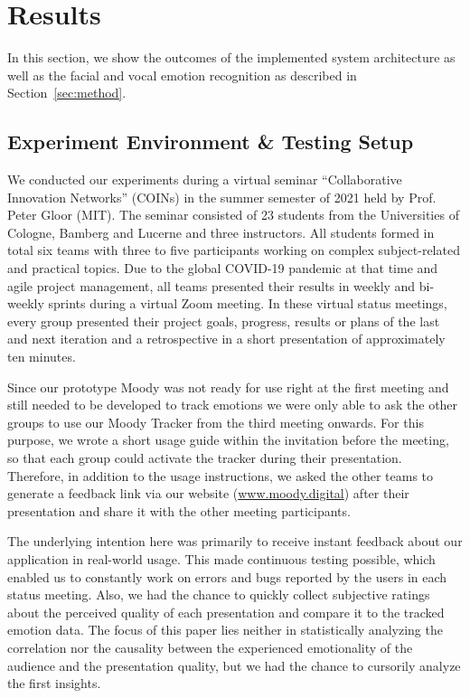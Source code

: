 \section{Results}
\label{sec:results}
In this section, we show the outcomes of the implemented system architecture as well as the facial and vocal emotion recognition as described in Section~\ref{sec:method}.

\subsection{Experiment Environment \& Testing Setup}
\label{subsec:results_experiment_environment_and_testing_setup}
We conducted our experiments during a virtual seminar ``Collaborative Innovation Networks'' (COINs) in the summer semester of 2021 held by Prof. Peter Gloor (MIT). The seminar consisted of 23 students from the Universities of Cologne, Bamberg and Lucerne and three instructors. All students formed in total six teams with three to five participants working on complex subject-related and practical topics. Due to the global COVID-19 pandemic at that time and agile project management, all teams presented their results in weekly and bi-weekly sprints during a virtual Zoom meeting. In these virtual status meetings, every group presented their project goals, progress, results or plans of the last and next iteration and a retrospective in a short presentation of approximately ten minutes.

Since our prototype Moody was not ready for use right at the first meeting and still needed to be developed to track emotions we were only able to ask the other groups to use our Moody Tracker from the third meeting onwards. For this purpose, we wrote a short usage guide within the invitation before the meeting, so that each group could activate the tracker during their presentation. Therefore, in addition to the usage instructions, we asked the other teams to generate a feedback link via our website (\url{www.moody.digital}) after their presentation and share it with the other meeting participants.

The underlying intention here was primarily to receive instant feedback about our application in real-world usage. This made continuous testing possible, which enabled us to constantly work on errors and bugs reported by the users in each status meeting. Also, we had the chance to quickly collect subjective ratings about the perceived quality of each presentation and compare it to the tracked emotion data. The focus of this paper lies neither in statistically analyzing the correlation nor the causality between the experienced emotionality of the audience and the presentation quality, but we had the chance to cursorily analyze the first insights.


